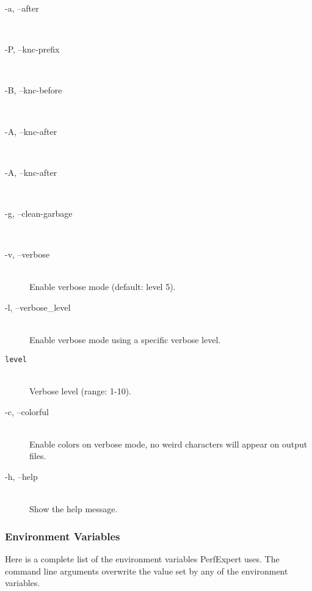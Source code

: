 \begin{description}
	\item[\btt -a, --after]\hfill \\

	\item[\btt -P, --knc-prefix]\hfill \\

	\item[\btt -B, --knc-before]\hfill \\

	\item[\btt -A, --knc-after]\hfill \\

	\item[\btt -A, --knc-after]\hfill \\

	\item[\btt -g, --clean-garbage]\hfill \\

	\item[\btt -v, --verbose]\hfill \\
	Enable verbose mode (default: level 5).

	\item[\btt -l, --verbose\_level]\hfill \\
	Enable verbose mode using a specific verbose level.

	\item[\tt level]\hfill \\
	Verbose level (range: 1-10).

	\item[\btt -c, --colorful]\hfill \\
	Enable colors on verbose mode, no weird characters will appear on output files.

	\item[\btt -h, --help]\hfill \\
	Show the help message.
\end{description}

\subsubsection{Environment Variables}

Here is a complete list of the environment variables PerfExpert uses. The command line arguments overwrite the value set by any of the environment variables.

